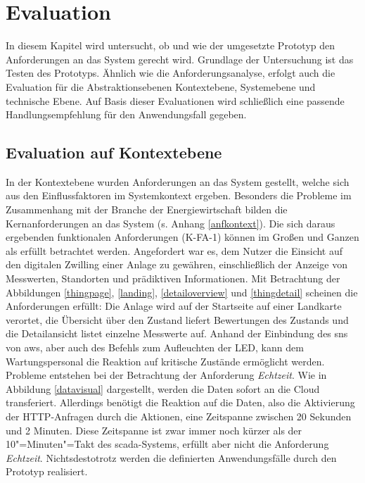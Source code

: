 \section{Evaluation}

In diesem Kapitel wird untersucht, ob und wie der umgesetzte Prototyp den Anforderungen an das System gerecht wird. Grundlage der Untersuchung ist das Testen des Prototyps. Ähnlich wie die Anforderungsanalyse, erfolgt auch die Evaluation für die Abstraktionsebenen Kontextebene, Systemebene und technische Ebene. Auf Basis dieser Evaluationen wird schließlich eine passende Handlungsempfehlung für den Anwendungsfall gegeben. 

\subsection{Evaluation auf Kontextebene}
In der Kontextebene wurden Anforderungen an das System gestellt, welche sich aus den Einflussfaktoren im Systemkontext ergeben. Besonders die Probleme im Zusammenhang mit der Branche der Energiewirtschaft bilden die Kernanforderungen an das System (s. Anhang \ref{anfkontext}). Die sich daraus ergebenden funktionalen Anforderungen (K-FA-1) können im Großen und Ganzen als erfüllt betrachtet werden. Angefordert war es, dem Nutzer die Einsicht auf den digitalen Zwilling einer Anlage zu gewähren, einschließlich der Anzeige von Messwerten, Standorten und prädiktiven Informationen. Mit Betrachtung der Abbildungen \ref{thingpage}, \ref{landing}, \ref{detailoverview} und \ref{thingdetail} scheinen die Anforderungen erfüllt: Die Anlage wird auf der Startseite auf einer Landkarte verortet, die Übersicht über den Zustand liefert Bewertungen des Zustands und die Detailansicht listet einzelne Messwerte auf. Anhand der Einbindung des \ac{sns} von \ac{aws}, aber auch des Befehls zum Aufleuchten der LED, kann dem Wartungspersonal die Reaktion auf kritische Zustände ermöglicht werden. Probleme entstehen bei der Betrachtung der Anforderung \textit{Echtzeit}. Wie in Abbildung \ref{datavisual} dargestellt, werden die Daten sofort an die Cloud transferiert. Allerdings benötigt die Reaktion auf die Daten, also die Aktivierung der HTTP-Anfragen durch die Aktionen, eine Zeitspanne zwischen 20 Sekunden und 2 Minuten. Diese Zeitspanne ist zwar immer noch kürzer als der 10"=Minuten"=Takt des \ac{scada}-Systems, erfüllt aber nicht die Anforderung \textit{Echtzeit}. Nichtsdestotrotz werden die definierten Anwendungsfälle durch den Prototyp realisiert. 

